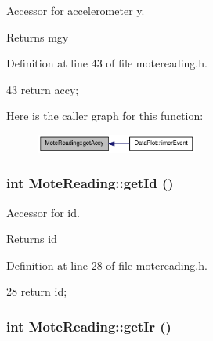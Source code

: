 Accessor for accelerometer y. 

\begin{DoxyReturn}{Returns}
mgy 
\end{DoxyReturn}


Definition at line 43 of file motereading.h.




\begin{DoxyCode}
43 { return accy; }
\end{DoxyCode}




Here is the caller graph for this function:\nopagebreak
\begin{figure}[H]
\begin{center}
\leavevmode
\includegraphics[width=151pt]{classMoteReading_af918c7ca6c9fea98a3d608b61dbaffae_icgraph}
\end{center}
\end{figure}


\hypertarget{classMoteReading_a123a08348d6a1ba80a4055cb5f5afaa6}{
\subsubsection[{getId}]{\setlength{\rightskip}{0pt plus 5cm}int MoteReading::getId ()}}
\label{classMoteReading_a123a08348d6a1ba80a4055cb5f5afaa6}


Accessor for id. 

\begin{DoxyReturn}{Returns}
id 
\end{DoxyReturn}


Definition at line 28 of file motereading.h.




\begin{DoxyCode}
28 { return id; }
\end{DoxyCode}


\hypertarget{classMoteReading_aff0d87f9c667d01f7e37a114afa321fa}{
\subsubsection[{getIr}]{\setlength{\rightskip}{0pt plus 5cm}int MoteReading::getIr ()}}
\label{classMoteReading_aff0d87f9c667d01f7e37a114afa321fa}


